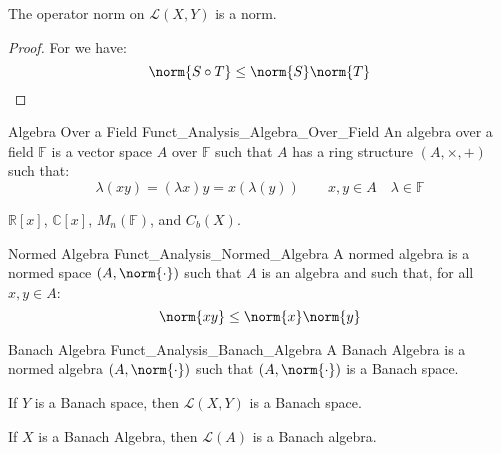         \begin{theorem}
            The operator norm on $\mathscr{L}(X,Y)$ is a norm.
        \end{theorem}
        \begin{proof}
            For we have:
            \begin{equation}
                \norm{S\circ{T}}\leq\norm{S}\norm{T}
            \end{equation}
        \end{proof}
        \begin{ldefinition}{Algebra Over a Field}
              {Funct_Analysis_Algebra_Over_Field}
            An algebra over a field $\mathbb{F}$ is a vector
            space $A$ over $\mathbb{F}$ such that $A$ has a ring
            structure $(A,\times,+)$ such that:
            \begin{equation}
                \lambda(xy)=(\lambda{x})y
                =x(\lambda(y))
                \quad\quad
                x,y\in{A}
                \quad\lambda\in\mathbb{F}
            \end{equation}
        \end{ldefinition}
        \begin{lexample}
            $\mathbb{R}[x]$, $\mathbb{C}[x]$, $M_{n}(\mathbb{F})$,
            and $C_{b}(X)$.
        \end{lexample}
        \begin{ldefinition}{Normed Algebra}
              {Funct_Analysis_Normed_Algebra}
            A normed algebra is a normed space $(A,\norm{\cdot})$
            such that $A$ is an algebra and such that,
            for all $x,y\in{A}$:
            \begin{equation}
                \norm{xy}\leq\norm{x}\norm{y}
            \end{equation}
        \end{ldefinition}
        \begin{ldefinition}{Banach Algebra}
              {Funct_Analysis_Banach_Algebra}
            A Banach Algebra is a normed algebra $(A,\norm{\cdot})$
            such that $(A,\norm{\cdot})$ is a Banach space.
        \end{ldefinition}
        \begin{theorem}
            If $Y$ is a Banach space, then $\mathscr{L}(X,Y)$
            is a Banach space.
        \end{theorem}
        \begin{theorem}
            If $X$ is a Banach Algebra, then
            $\mathscr{L}(A)$ is a Banach algebra.
        \end{theorem}
